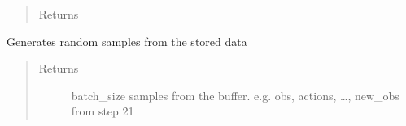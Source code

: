 \documentclass[letterpaper,10pt,english]{sphinxmanual}
\begin{document}
\begin{fulllineitems}
\begin{fulllineitems}
\begin{quote}
\begin{description}
\begin{itemize}
\end{itemize}

\item[{Returns}] \leavevmode
\sphinxAtStartPar


\end{description}\end{quote}

\end{fulllineitems}


\begin{fulllineitems}
\label{\detokenize{agents.reinforcement_learning:agents.reinforcement_learning.dqn.MemoryBuffer.get_samples}}
\sphinxAtStartPar
Generates random samples from the stored data
\begin{quote}\begin{description}
\item[{Returns}] \leavevmode
\sphinxAtStartPar
batch\_size samples from the buffer. e.g. obs, actions, …, new\_obs from step 21

\end{description}\end{quote}

\end{fulllineitems}


\end{fulllineitems}

\end{document}
